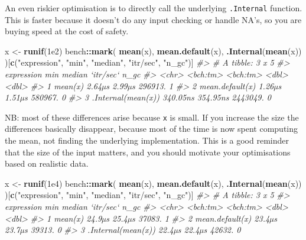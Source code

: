 \documentclass[]{book}
\newenvironment{Shaded}{\begin{snugshade}}{\end{snugshade}}
\newcommand{\CommentTok}[1]{\textcolor[rgb]{0.37,0.37,0.37}{\textit{#1}}}
\newcommand{\FloatTok}[1]{\textcolor[rgb]{0.06,0.06,0.06}{#1}}
\newcommand{\KeywordTok}[1]{\textcolor[rgb]{0.27,0.27,0.27}{\textbf{#1}}}
\newcommand{\NormalTok}[1]{#1}
\newcommand{\OperatorTok}[1]{\textcolor[rgb]{0.43,0.43,0.43}{\textbf{#1}}}
\newcommand{\StringTok}[1]{\textcolor[rgb]{0.5,0.5,0.5}{#1}}
\begin{document}
An even riskier optimisation is to directly call the underlying \texttt{.Internal} function. This is faster because it doesn't do any input checking or handle NA's, so you are buying speed at the cost of safety.

\begin{Shaded}
\begin{Highlighting}[]
\NormalTok{x <-}\StringTok{ }\KeywordTok{runif}\NormalTok{(}\FloatTok{1e2}\NormalTok{)}
\NormalTok{bench}\OperatorTok{::}\KeywordTok{mark}\NormalTok{(}
  \KeywordTok{mean}\NormalTok{(x),}
  \KeywordTok{mean.default}\NormalTok{(x),}
  \KeywordTok{.Internal}\NormalTok{(}\KeywordTok{mean}\NormalTok{(x))}
\NormalTok{)[}\KeywordTok{c}\NormalTok{(}\StringTok{"expression"}\NormalTok{, }\StringTok{"min"}\NormalTok{, }\StringTok{"median"}\NormalTok{, }\StringTok{"itr/sec"}\NormalTok{, }\StringTok{"n_gc"}\NormalTok{)]}
\CommentTok{#> # A tibble: 3 x 5}
\CommentTok{#>   expression              min   median `itr/sec`  n_gc}
\CommentTok{#>   <chr>              <bch:tm> <bch:tm>     <dbl> <dbl>}
\CommentTok{#> 1 mean(x)              2.64µs   2.99µs   296913.     1}
\CommentTok{#> 2 mean.default(x)      1.26µs   1.51µs   580967.     0}
\CommentTok{#> 3 .Internal(mean(x)) 340.05ns 354.95ns  2443049.     0}
\end{Highlighting}
\end{Shaded}

NB: most of these differences arise because \texttt{x} is small. If you increase the size the differences basically disappear, because most of the time is now spent computing the mean, not finding the underlying implementation. This is a good reminder that the size of the input matters, and you should motivate your optimisations based on realistic data.

\begin{Shaded}
\begin{Highlighting}[]
\NormalTok{x <-}\StringTok{ }\KeywordTok{runif}\NormalTok{(}\FloatTok{1e4}\NormalTok{)}
\NormalTok{bench}\OperatorTok{::}\KeywordTok{mark}\NormalTok{(}
  \KeywordTok{mean}\NormalTok{(x),}
  \KeywordTok{mean.default}\NormalTok{(x),}
  \KeywordTok{.Internal}\NormalTok{(}\KeywordTok{mean}\NormalTok{(x))}
\NormalTok{)[}\KeywordTok{c}\NormalTok{(}\StringTok{"expression"}\NormalTok{, }\StringTok{"min"}\NormalTok{, }\StringTok{"median"}\NormalTok{, }\StringTok{"itr/sec"}\NormalTok{, }\StringTok{"n_gc"}\NormalTok{)]}
\CommentTok{#> # A tibble: 3 x 5}
\CommentTok{#>   expression              min   median `itr/sec`  n_gc}
\CommentTok{#>   <chr>              <bch:tm> <bch:tm>     <dbl> <dbl>}
\CommentTok{#> 1 mean(x)              24.9µs   25.4µs    37083.     1}
\CommentTok{#> 2 mean.default(x)      23.4µs   23.7µs    39313.     0}
\CommentTok{#> 3 .Internal(mean(x))   22.4µs   22.4µs    42632.     0}
\end{Highlighting}
\end{Shaded}
\end{document}
